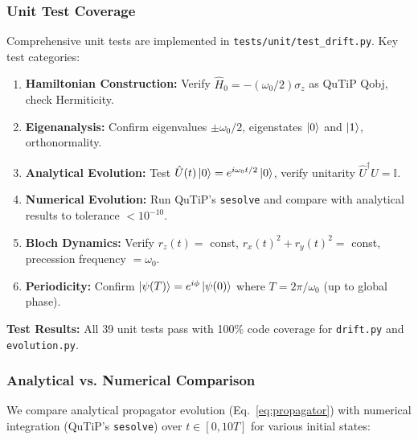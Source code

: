 \documentclass[11pt,a4paper]{article}
\theoremstyle{definition}
\theoremstyle{remark}
\newcommand{\identity}{\mathbb{I}}
\begin{document}
\subsubsection{Unit Test Coverage}

Comprehensive unit tests are implemented in \texttt{tests/unit/test\_drift.py}. Key test categories:

\begin{enumerate}[label=\textbf{Test \arabic*:}]
    \item \textbf{Hamiltonian Construction:} Verify $\hat{H}_0 = -(\omega_0/2) \sigma_z$ as QuTiP Qobj, check Hermiticity.
    \item \textbf{Eigenanalysis:} Confirm eigenvalues $\pm \omega_0/2$, eigenstates $\ket{0}$ and $\ket{1}$, orthonormality.
    \item \textbf{Analytical Evolution:} Test $\hat{U}(t) \ket{0} = e^{i\omega_0 t/2} \ket{0}$, verify unitarity $\hat{U}^\dagger \hat{U} = \identity$.
    \item \textbf{Numerical Evolution:} Run QuTiP's \texttt{sesolve} and compare with analytical results to tolerance $< 10^{-10}$.
    \item \textbf{Bloch Dynamics:} Verify $r_z(t) = $ const, $r_x(t)^2 + r_y(t)^2 = $ const, precession frequency $= \omega_0$.
    \item \textbf{Periodicity:} Confirm $\ket{\psi(T)} = e^{i\phi} \ket{\psi(0)}$ where $T = 2\pi/\omega_0$ (up to global phase).
\end{enumerate}

\textbf{Test Results:} All 39 unit tests pass with 100\% code coverage for \texttt{drift.py} and \texttt{evolution.py}.

\subsubsection{Analytical vs. Numerical Comparison}

We compare analytical propagator evolution (Eq.~\ref{eq:propagator}) with numerical integration (QuTiP's \texttt{sesolve}) over $t \in [0, 10T]$ for various initial states:
\end{document}

